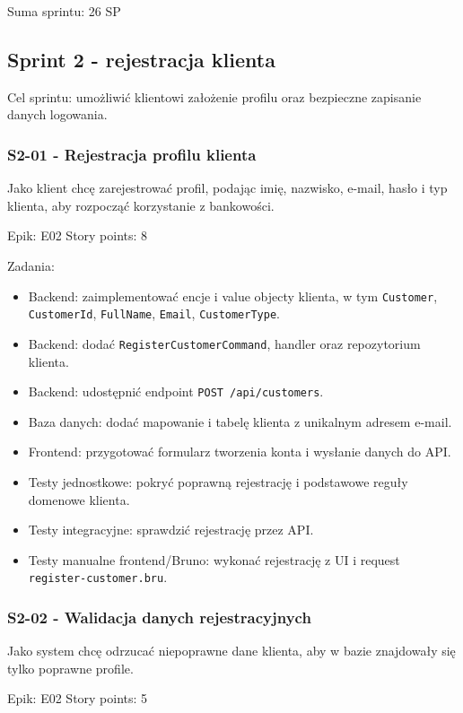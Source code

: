 \documentclass[12pt,a4paper]{article}
\begin{document}
Suma sprintu: 26 SP

\subsection*{Sprint 2 - rejestracja klienta}

Cel sprintu: umożliwić klientowi założenie profilu oraz bezpieczne zapisanie danych logowania.

\subsubsection*{S2-01 - Rejestracja profilu klienta}

Jako klient chcę zarejestrować profil, podając imię, nazwisko, e-mail, hasło i typ klienta, aby rozpocząć korzystanie z bankowości.

Epik: E02
Story points: 8

Zadania:

\begin{itemize}
\item Backend: zaimplementować encje i value objecty klienta, w tym \texttt{Customer}, \texttt{CustomerId}, \texttt{FullName}, \texttt{Email}, \texttt{CustomerType}.
\item Backend: dodać \texttt{RegisterCustomerCommand}, handler oraz repozytorium klienta.
\item Backend: udostępnić endpoint \texttt{POST /api/customers}.
\item Baza danych: dodać mapowanie i tabelę klienta z unikalnym adresem e-mail.
\item Frontend: przygotować formularz tworzenia konta i wysłanie danych do API.
\item Testy jednostkowe: pokryć poprawną rejestrację i podstawowe reguły domenowe klienta.
\item Testy integracyjne: sprawdzić rejestrację przez API.
\item Testy manualne frontend/Bruno: wykonać rejestrację z UI i request \texttt{register-customer.bru}.
\end{itemize}

\subsubsection*{S2-02 - Walidacja danych rejestracyjnych}

Jako system chcę odrzucać niepoprawne dane klienta, aby w bazie znajdowały się tylko poprawne profile.

Epik: E02
Story points: 5
\end{document}
